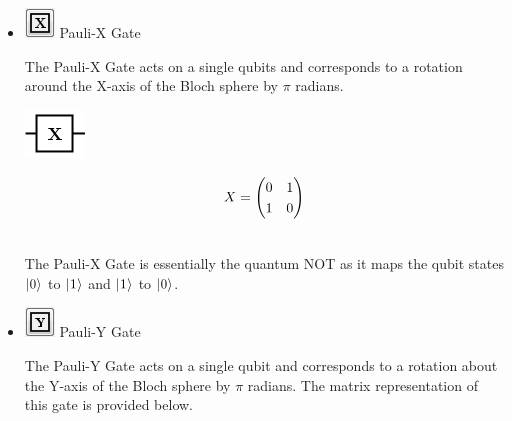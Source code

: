 \documentclass[10pt]{article}
\theoremstyle{definition}
\newcommand{\microspace}{\mspace{0.5mu}}
\def \lket {\left|}
\def \rket {\right\rangle}
\newcommand{\ket}[1]{\lket\microspace #1 \microspace\rket}
\begin{document}
\begin{itemize}
\begin{center}
\end{center}

\item \includegraphics{Figures/Gates/XGate.png}  Pauli-X Gate

The Pauli-X Gate acts on a single qubits and corresponds to a rotation around the X-axis of the Bloch sphere by $\pi$ radians.

\begin{center}
\includegraphics[scale=.7]{Figures/Gates/XGateViewer} \\
  \begin{minipage}{.9\linewidth}
    \begin{equation*} \label{mat:XGate}
    \renewcommand{\arraystretch}{1.25}
X = \begin{pmatrix} 0 & 1 \\ 1 & 0 \end{pmatrix}
    \end{equation*}
  \end{minipage}\hspace{-2.5cm}
  \begin{minipage}{.2\linewidth}
  \vspace*{3pt}
    \begin{align}
    \end{align}
  \end{minipage}
\end{center}

The Pauli-X Gate is essentially the quantum NOT as it maps the qubit states $\ket{0}$ to $\ket{1}$ and $\ket{1}$ to $\ket{0}$. 

\item \includegraphics{Figures/Gates/YGate.png}  Pauli-Y Gate

The Pauli-Y Gate acts on a single qubit and corresponds to a rotation about the Y-axis of the Bloch sphere by $\pi$ radians. The matrix representation of this gate is provided below. 


\end{itemize}
\end{document}
